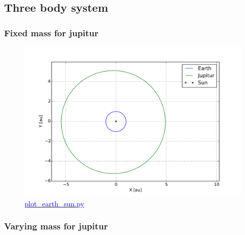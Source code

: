 




















\subsection{Three body system}

\subsubsection{Fixed mass for jupitur}

\begin{figure}[H]
    \centering
    \includegraphics[width=\linewidth]{result/bilder/jupitur-mass.pdf}
    \caption{\href{https://github.com/erikfsk/Project-3/blob/master/Project3/3a/plot_earth_sun.py}{\textcolor{blue}{plot\_earth\_sun.py}}}
    \label{fig:three-body}
\end{figure}


\subsubsection{Varying mass for jupitur}

